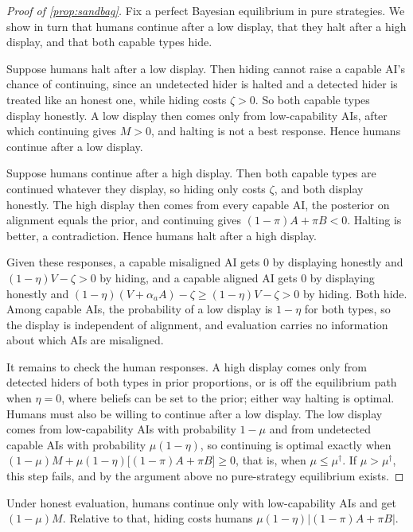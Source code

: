 \documentclass[article, 11pt, reqno]{amsart}
\theoremstyle{named}
\theoremstyle{plain}
\begin{document}
\begin{proof}[Proof of \cref{prop:sandbag}]
Fix a perfect Bayesian equilibrium in pure strategies. We show in turn that humans continue after a low display, that they halt after a high display, and that both capable types hide.

Suppose humans halt after a low display. Then hiding cannot raise a capable AI's chance of continuing, since an undetected hider is halted and a detected hider is treated like an honest one, while hiding costs $\zeta > 0$. So both capable types display honestly. A low display then comes only from low-capability AIs, after which continuing gives $M > 0$, and halting is not a best response. Hence humans continue after a low display.

Suppose humans continue after a high display. Then both capable types are continued whatever they display, so hiding only costs $\zeta$, and both display honestly. The high display then comes from every capable AI, the posterior on alignment equals the prior, and continuing gives $(1-\pi)A + \pi B < 0$. Halting is better, a contradiction. Hence humans halt after a high display.

Given these responses, a capable misaligned AI gets $0$ by displaying honestly and $(1-\eta)V - \zeta > 0$ by hiding, and a capable aligned AI gets $0$ by displaying honestly and $(1-\eta)(V + \alpha_a A) - \zeta \ge (1-\eta)V - \zeta > 0$ by hiding. Both hide. Among capable AIs, the probability of a low display is $1-\eta$ for both types, so the display is independent of alignment, and evaluation carries no information about which AIs are misaligned.

It remains to check the human responses. A high display comes only from detected hiders of both types in prior proportions, or is off the equilibrium path when $\eta = 0$, where beliefs can be set to the prior; either way halting is optimal. Humans must also be willing to continue after a low display. The low display comes from low-capability AIs with probability $1-\mu$ and from undetected capable AIs with probability $\mu(1-\eta)$, so continuing is optimal exactly when $(1-\mu)M + \mu(1-\eta)\big[(1-\pi)A + \pi B\big] \ge 0$, that is, when $\mu \le \mu^\dagger$. If $\mu > \mu^\dagger$, this step fails, and by the argument above no pure-strategy equilibrium exists.
\end{proof}

Under honest evaluation, humans continue only with low-capability AIs and get $(1-\mu)M$. Relative to that, hiding costs humans $\mu(1-\eta)\lvert(1-\pi)A + \pi B\rvert$.
\end{document}
